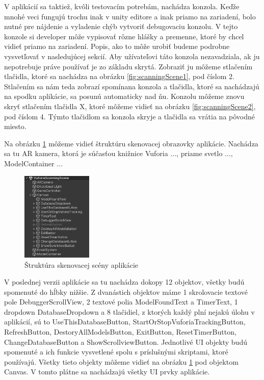 V aplikácií sa taktiež, kvôli testovacím potrebám, nachádza konzola. Keďže mnohé veci fungujú trochu inak v unity editore a inak priamo na zariadení, bolo nutné pre nájdenie a vyladenie chýb vytvoriť debugovaciu konzolu. V tejto konzole si developer môže vypisovať rôzne hlášky a premenne, ktoré by chcel vidieť priamo na zariadení. Popis, ako to môže urobiť budeme podrobne vysvetľovať v nasledujúcej sekcií. Aby užívateľovi táto konzola nezavadziala, ak ju nepotrebuje práve používať je zo základu skrytá. Zobraziť ju môžeme stlačením tlačidla, ktoré sa nachádza na obrázku \ref{fig:scanningScene1}, pod číslom 2. Stlačením sa nám teda zobrazí spomínana konzola a tlačidla, ktoré sa nachádzajú na spodku aplikácie, sa posunú automaticky nad ňu. Konzolu môžeme znovu skryť stlačením tlačidla X, ktoré môžeme vidieť na obrázku \ref{fig:scanningScene2}, pod číslom 4. Týmto tlačidlom sa konzola skryje a tlačidla sa vrátia na pôvodné miesto.

\FloatBarrier 


Na obrázku \ref{fig:scanningSceneStructure} môžeme vidieť štruktúru skenovacej obrazovky aplikácie. Nachádza sa tu AR kamera, ktorá je súčasťou knižnice Vuforia ..., priame svetlo ..., ModelContainer ... %

\begin{figure}[h]
  \centering
  \includegraphics[width=0.3\textwidth]{img/structure_scanning.png}
  \caption{Štruktúra skenovacej scény aplikácie}
  \label{fig:scanningSceneStructure}
\end{figure}

V poslednej verzii aplikácie sa tu nachádza dokopy 12 objektov, všetky budú spomenuté do hĺbky nižšie. Z dvanástich objektov máme 1 skrolovacie textové pole DebuggerScrollView, 2 textové polia ModelFoundText a TimerText, 1 dropdown DatabaseDropdown a 8 tlačidiel, z ktorých každý plní nejakú úlohu v aplikácií, sú to UseThisDatabaseButton, StartOrStopVuforiaTrackingButton, RefreshButton, DestoryAllModelsButton, ExitButton, ResetTimerButton, ChangeDatabaseButton a ShowScrollviewButton. Jednotlivé UI objekty budú spomenuté a ich funkcie vysvetlené spolu s príslušnými skriptami, ktoré používajú. Všetky tieto objekty môžeme vidieť na obrázku \ref{fig:scanningSceneStructure} pod objektom Canvas. V tomto plátne sa nachádzajú všetky UI prvky aplikácie.

